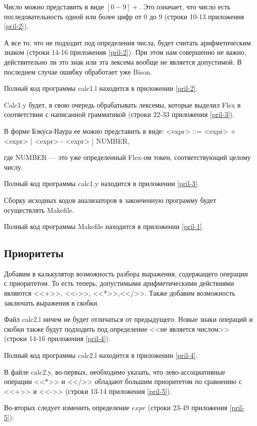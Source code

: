 \documentclass[bachelor, och, coursework, times]{SCWorks}
\begin{document}
Число можно представить в виде $[0-9]+$. Это означает, что число есть последовательность одной или более цифр от 0 до 9 (строки 10-13 приложения \ref{pril-2}).

А все то, что не подходит под определения числа, будет считать арифметическим знаком (строки 14-16 приложения \ref{pril-2}). При этом нам совершенно не важно, действительно ли это знак или эта лексема вообще не является допустимой. В последнем случае ошибку обработает уже Bison.

Полный код программы calc1.l находится в приложении \ref{pril-2}.

Calc1.y будет, в свою очередь обрабатывать лексемы, которые выделил Flex в соответствии с написанной грамматикой (строки 22-33 приложения \ref{pril-3}).

В форме Бэкуса-Наура ее можно представить в виде: \linebreak
<expr> ::= <expr> + <expr> | <expr> - <expr> | NUMBER,

где NUMBER --- это уже определенный Flex-ом токен, соответствующий целому числу.

Полный код программы calc1.y находится в приложении \ref{pril-3}.

Сборку исходных кодов анализаторов в законченную программу будет осуществлять Makefile.

Полный код программы Makefile находится в приложении \ref{pril-1}.

\subsection{Приоритеты}
Добавим в калькулятор возможность разбора выражения, содержащего операции с приоритетом. То есть теперь, допустимыми арифметическими действиями являются <<+>>, <<->>, <<*>>,<</>>. Также добавим возможность заключать выражения в скобки.

Файл calc2.l ничем не будет отличаться от предыдущего. Новые знаки операций и скобки также будут подходить под определение <<не является числом>> (строки 14-16 приложения \ref{pril-4}).

Полный код программы calc2.l находится в приложении \ref{pril-4}.

В файле calc2.y, во-первых, необходимо указать, что лево-ассоциативные операции <<*>> и <</>> обладают большим приоритетом по сравнению с <<+>> и <<->> (строки 13-14 приложения \ref{pril-5}).

Во-вторых следует изменить определение $expr$ (строки 23-49 приложения \ref{pril-5}): 
\end{document}
